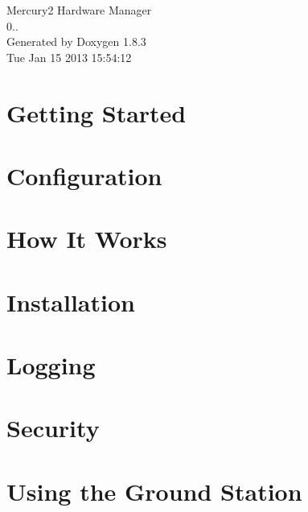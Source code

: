 \documentclass{book}
\begin{document}
\hypersetup{pageanchor=false,citecolor=blue}
\begin{titlepage}
\vspace*{7cm}
\begin{center}
{\Large Mercury2 Hardware Manager \\[1ex]\large 0.. }\\
\vspace*{1cm}
{\large Generated by Doxygen 1.8.3}\\
\vspace*{0.5cm}
{\small Tue Jan 15 2013 15:54:12}\\
\end{center}
\end{titlepage}
\clearemptydoublepage
{}
\tableofcontents
\clearemptydoublepage
{}
\hypersetup{pageanchor=true,citecolor=blue}
\chapter{Getting Started}
\label{index}\hypertarget{index}{}
\chapter{Configuration}
\label{Configuration}
\hypertarget{Configuration}{}

\chapter{How It Works}
\label{how_it_works}
\hypertarget{how_it_works}{}

\chapter{Installation}
\label{installation}
\hypertarget{installation}{}

\chapter{Logging}
\label{logging}
\hypertarget{logging}{}

\chapter{Security}
\label{security}
\hypertarget{security}{}

\chapter{Using the Ground Station}
\label{using_the_ground_station}
\hypertarget{using_the_ground_station}{}

\end{document}
